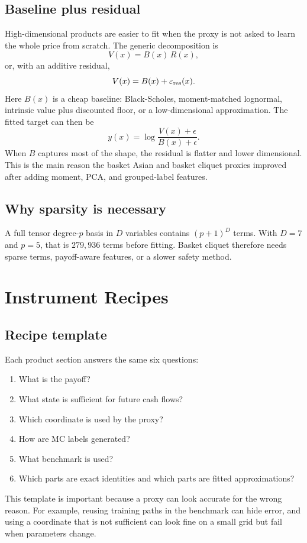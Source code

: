 \documentclass[11pt,oneside]{book}
\theoremstyle{definition}
\begin{document}
\section{Baseline plus residual}
High-dimensional products are easier to fit when the proxy is not asked to learn the whole price from scratch. The generic decomposition is
\[
  V(x)=B(x)\,R(x),
\]
or, with an additive residual,
\[
  V(x)=B(x)+\varepsilon_{\rm res}(x).
\]
Here \(B(x)\) is a cheap baseline: Black-Scholes, moment-matched lognormal, intrinsic value plus discounted floor, or a low-dimensional approximation. The fitted target can then be
\[
  y(x)=\log\frac{V(x)+\epsilon}{B(x)+\epsilon}.
\]
When \(B\) captures most of the shape, the residual is flatter and lower dimensional. This is the main reason the basket Asian and basket cliquet proxies improved after adding moment, PCA, and grouped-label features.

\section{Why sparsity is necessary}
A full tensor degree-\(p\) basis in \(D\) variables contains \((p+1)^D\) terms. With \(D=7\) and \(p=5\), that is \(279{,}936\) terms before fitting. Basket cliquet therefore needs sparse terms, payoff-aware features, or a slower safety method.

\chapter{Instrument Recipes}

\section{Recipe template}
Each product section answers the same six questions:
\begin{enumerate}
  \item What is the payoff?
  \item What state is sufficient for future cash flows?
  \item Which coordinate is used by the proxy?
  \item How are MC labels generated?
  \item What benchmark is used?
  \item Which parts are exact identities and which parts are fitted approximations?
\end{enumerate}
This template is important because a proxy can look accurate for the wrong reason. For example, reusing training paths in the benchmark can hide error, and using a coordinate that is not sufficient can look fine on a small grid but fail when parameters change.
\end{document}
